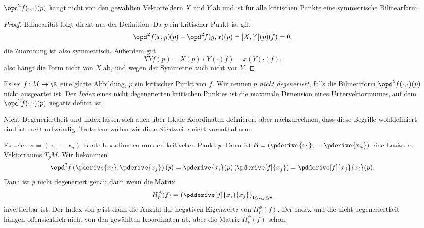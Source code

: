 \begin{prop}
    \label{prop: hessische ist sym bilinearform}
    $\opd^2 f (\cdot, \cdot) (p)$ hängt nicht von den gewählten Vektorfeldern $X$ und $Y$ ab 
    und ist für alle kritischen Punkte eine symmetrische Bilinearform.
\end{prop}

\begin{proof}
    Bilinearität folgt direkt aus der Definition.
    Da $p$ ein kritischer Punkt ist gilt 
    \[ \opd^2 f (x, y) (p) - \opd^2 f (y, x) (p) = [X, Y] (p) (f) = 0, \]
    die Zuordnung ist also symmetrisch. Außerdem gilt
    \[ XY f (p) = X(p) (Y(\cdot) f) = x(Y(\cdot) f), \]
    also hängt die Form nicht von $X$ ab, und wegen der Symmetrie auch nicht von $Y$.
\end{proof}

\begin{definition}
    \label{def: nicht-degeneriert u index}
    Es sei $f \colon M \to \R$ eine glatte Abbildung, $p$ ein kritischer Punkt von
    $f$. Wir nennen $p$ \textit{nicht degeneriert}, falls die Bilinearform 
    $\opd^2 f (\cdot, \cdot) (p)$ nicht ausgeartet ist. Der \textit{Index} eines
    nicht degenerierten kritischen Punktes ist die maximale Dimension eines
    Untervektorraumes, auf dem $\opd^2 f (\cdot, \cdot) (p)$ negativ definit ist.
\end{definition}

\begin{remark}
    Nicht-Degeneriertheit und Index lassen sich auch über lokale Koordinaten definieren,
    aber nachzurechnen, dass diese Begriffe wohldefiniert sind ist recht aufwändig.
    Trotzdem wollen wir diese Sichtweise nicht vorenthaltern:

    Es seien $\phi = (x_1, ..., x_n)$ lokale Koordinaten um den kritischen Punkt $p$. 
    Dann ist $\mathcal{B} = \left(\pderive{x_1}, ..., \pderive{x_n}\right)$ eine Basis des
    Vektorraums $T_pM$. Wir bekommen
    \[ 
        \opd^2 f \left( \pderive{x_i}, \pderive{x_j} \right) (p) 
        = \pderive{x_i}(p) \left( \pderive[f]{x_j} \right) 
        = \pdderive[f]{x_j}{x_i} (p).
    \]
    Dann ist $p$ nicht degeneriert genau dann wenn die Matrix
    \[ H^\phi_p(f) = \left( \pdderive[f]{x_i}{x_j} \right)_{1 \leq i, j \leq n} \]
    invertierbar ist. Der Index von $p$ ist dann die Anzahl der negativen Eigenwerte
    von $H^\phi_p(f)$. Der Index und die nicht-degeneriertheit hängen offensichtlich
    nicht von den gewählten Koordinaten ab, aber die Matrix $H_p^{\phi}(f)$ schon.
\end{remark}

